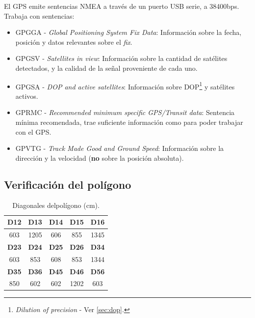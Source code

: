 \documentclass[main]{subfiles}
\begin{document}
El GPS emite sentencias NMEA a través de un puerto USB serie, a 38400bps. Trabaja con sentencias:
\begin{itemize}
\item GPGGA - \textit{Global Positioning System Fix Data}: Información sobre la fecha, posición y datos relevantes sobre el \textit{fix}.
\item GPGSV - \textit{Satellites in view}: Información sobre la cantidad de satélites detectados, y la calidad de la se\~nal proveniente de cada uno.
\item GPGSA - \textit{DOP and active satellites}: Información sobre DOP\footnote{\textit{Dilution of precision} - Ver \ref{sec:dop}.} y satélites activos.
\item GPRMC - \textit{Recommended minimum specific GPS/Transit data}: Sentencia mínima recomendada, trae suficiente información como para poder trabajar con el GPS.
\item GPVTG - \textit{Track Made Good and Ground Speed}: Información sobre la dirección y la velocidad (\textbf{no} sobre la posición absoluta).
\end{itemize}

\subsection{Verificación del polígono}
\label{sec:verificacion-del-poligono}

\begin{table}
\centering
\vspace{-15pt}
\begin{tabular}{|c|c|c|c|c|}
\hline
\rowcolor[gray]{0.9}
\textbf{D12} & \textbf{D13} & \textbf{D14} & \textbf{D15} & \textbf{D16} \\
\hline
603 & 1205 & 606 & 855 & 1345 \\
\hline
\rowcolor[gray]{0.9}
\textbf{D23} & \textbf{D24} & \textbf{D25} & \textbf{D26} & \textbf{D34} \\
\hline
603 & 853 & 608 & 853 & 1344\\
\hline
\rowcolor[gray]{0.9}
\textbf{D35} & \textbf{D36} & \textbf{D45} & \textbf{D46} & \textbf{D56} \\
\hline
850 & 602 & 602 & 1202 & 603 \\
\hline
\end{tabular}
\caption{Diagonales del\newline pol\'igono (cm).}\label{tab:diagonales-poligono}
\vspace{-30pt}
\end{table}
\end{document}
